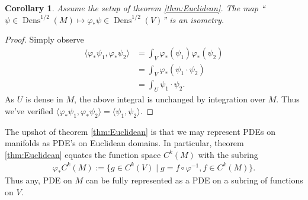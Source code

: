 \documentclass[letterpaper, 10 pt, conference]{ieeeconf}
\newcommand{\R}{\mathbb{R}}
\newtheorem{thm}{Theorem}[section]
\newtheorem{cor}[thm]{Corollary}
\DeclareMathOperator{\Dens}{Dens}
\begin{document}
  \begin{cor}
    Assume the setup of theorem \ref{thm:Euclidean}.
    The map 
    ``$\psi \in \Dens^{1/2}(M) \mapsto \varphi_* \psi \in \Dens^{1/2}(V)$''
    is an isometry.
  \end{cor}
  \begin{proof}
    Simply observe
    \begin{align*}
      \langle \varphi_*\psi_1 , \varphi_*\psi_2 \rangle
      &= \int_V \varphi_*(\psi_1) \varphi_*(\psi_2) \\
      &= \int_V \varphi_*( \psi_1 \cdot \psi_2) \\
      &= \int_U \psi_1 \cdot \psi_2.
    \end{align*}
    As $U$ is dense in $M$, the above integral is unchanged by integration
    over $M$.   Thus we've verified $\langle \varphi_* \psi_1,\varphi_*\psi_2 \rangle = \langle \psi_1,\psi_2 \rangle$.
  \end{proof}

  The upshot of theorem \ref{thm:Euclidean} is that we may represent PDEs on manifolds
  as PDE's on Euclidean domains.
  In particular, theorem \ref{thm:Euclidean} equates the function
  space $C^k(M)$ with the subring
  \begin{align*}
    \varphi_*C^k(M) := \{ g \in C^k(V) \mid g = f \circ \varphi^{-1} , f \in C^k(M) \}.
  \end{align*}
  Thus any, PDE on $M$ can be fully represented as a PDE on a 
  subring of functions on $V$.
  


  
\end{document}
